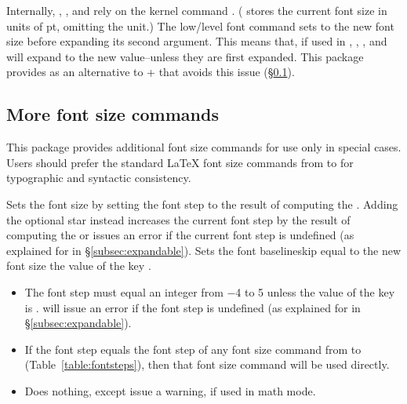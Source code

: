 \documentclass{beery}
\begin{document}
Internally, , , and  rely on the kernel command .
( stores the current font size in units of \unit{pt}, omitting the unit.)
The low\-/level font command  sets  to the new font size before expanding its second argument.
This means that, if used in , , , and  will expand to the new value\---unless they are first expanded.
This package provides  as an alternative to  +  that avoids this issue (\S\ref{subsec:fontsize}).

\subsection{More font size commands}
\label{subsec:fontsize}

This package provides additional font size commands for use only in special cases.
Users should prefer the standard \LaTeX{} font size commands from  to  for typographic and syntactic consistency.

 \sarg{} 
\KeepNextPar*

Sets the font size by setting the font step to the result of computing the .
Adding the optional star instead increases the current font step by the result of computing the  or issues an error if the current font step is undefined (as explained for  in \S\ref{subsec:expandable}).
Sets the font baselineskip equal to the new font size \texttimes{} the value of the key .

\begin{itemize}
  \item
  The font step must equal an integer from \num{-4} to \num{5} unless the value of the key  is .
   will issue an error if the font step is undefined (as explained for  in \S\ref{subsec:expandable}).
  \item
  If the font step equals the font step of any font size command from  to  (Table~\ref{table:fontsteps}), then that font size command will be used directly.
  \item
  Does nothing, except issue a warning, if used in math mode.
\end{itemize}
\end{document}
